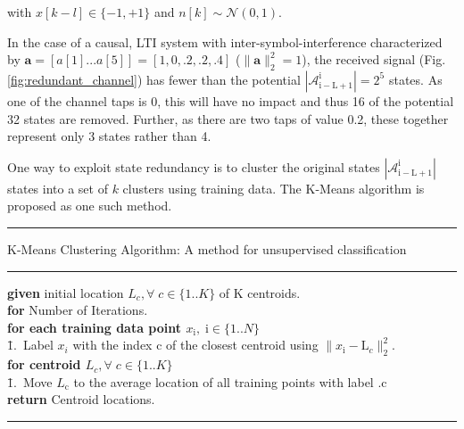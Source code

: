 \documentclass[12pt,a4paper]{article}
\begin{document}
with $x[k-l] \in \{ -1, +1\}$ and $n[k]  \sim \mathcal{N}(0,1)$.  

In the case of a causal, LTI system with inter-symbol-interference characterized by $\mathbf{a} = [a[1]...a[5]]=[1, 0, .2, .2, .4]$ ($\|\mathbf{a}\|^2_2 = 1$), the received signal (Fig.\ref{fig:redundant_channel}) has fewer than the potential $|\mathcal{A}_{\mathrm{i-L+1}}^{\mathrm{i}}| =2^5$ states. As one of the channel taps is 0, this will have no impact and thus 16 of the potential 32 states are removed. Further, as there are two taps of value 0.2, these together represent only 3 states rather than 4. 


One way to exploit state redundancy is to cluster the original states $|\mathcal{A}_{\mathrm{i-L+1}}^{\mathrm{i}}|$  states into a set of $k$ clusters using training data. The K-Means algorithm is proposed as one such method.
\\

    \noindent\rule[16pt]{\textwidth}{0.6pt}
K-Means Clustering Algorithm: A method for unsupervised classification

    \noindent\rule[10pt]{\textwidth}{0.4pt}
    {\footnotesize
    \begin{tabbing}
    {\bf given} initial location $L_c, \forall \;c  \in \{1..K\}$ of K centroids.\\
        {\textbf{for} Number of Iterations}.\\
         \qquad \= {\bf for each training data point $x_{\mathrm{i}}, \;\mathrm{i}  \in \{1..N\}$}\\
        \qquad \qquad \= 1.\ Label $x_i$ with the index c of the closest centroid using $\|x_{\mathrm{i}}- \text{L}_c\|^2_2$. \\
        \qquad \= {\bf for centroid $L_c, \forall \;c  \in \{1..K\}$}\\
                \qquad \qquad \= 1.\ Move $L_{\mathrm{c}}$ to the average location of all training points with label .c\\


        {\bf return} Centroid locations.
    \end{tabbing}}
    \noindent\rule[10pt]{\textwidth}{0.4pt}
    
\end{document}
